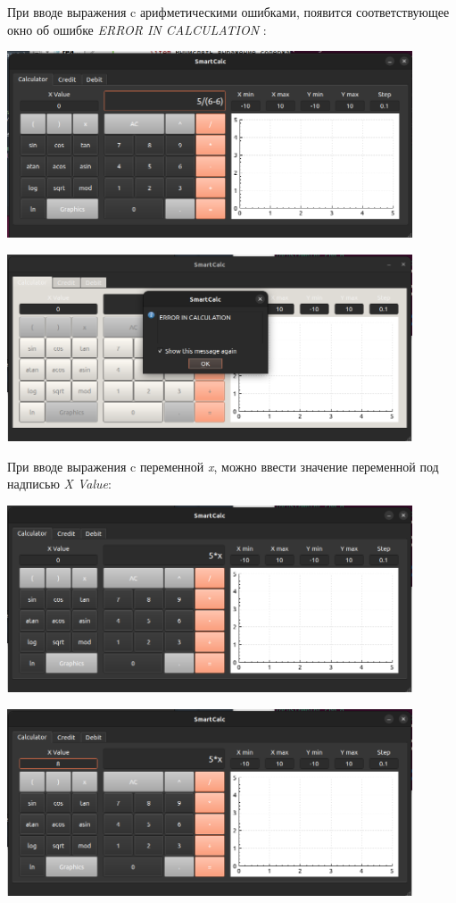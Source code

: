 \documentclass[12pt, letterpaper, twoside]{article}
\begin{document}
	\par При вводе выражения c арифметическими ошибками, появится соответствующее окно об ошибке \textit{ERROR IN CALCULATION} :
	\par \includegraphics[width=12cm]{17}
	\par \includegraphics[width=12cm]{6}
	\centering
	\par При вводе выражения c переменной \textit{x}, можно ввести значение переменной под надписью \textit{X Value}:
	\par \includegraphics[width=12cm]{7}
	\par \includegraphics[width=12cm]{8}
\end{document}
